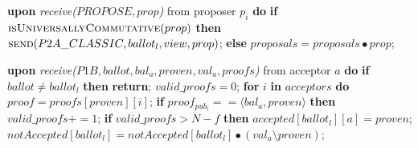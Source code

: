 \begin{algorithm}
\begin{algorithmic}[1]
		\State
		\State \textbf{upon} \textit{receive($PROPOSE, prop$)} from proposer $p_i$ \textbf{do} 
		\State \hspace{\algorithmicindent} \textbf{if} $\Call{isUniversallyCommutative}{prop}$ \textbf{then}
		\State \hspace{\algorithmicindent}\hspace{\algorithmicindent} $\Call{send}{P2A\_CLASSIC, ballot_l,view, prop}$;
		\State \hspace{\algorithmicindent} \textbf{else}
		\State \hspace{\algorithmicindent}\hspace{\algorithmicindent} $proposals = proposals \bullet prop$;
		
		\State
		\State \textbf{upon} \textit{receive($P1B, ballot, bal_a, proven,val_a, proofs$)} from acceptor $a$ \textbf{do}
		\State \hspace{\algorithmicindent} \textbf{if} $ballot \neq ballot_l$ \textbf{then}
		\State \hspace{\algorithmicindent}\hspace{\algorithmicindent} \textbf{return};
		\State
		\State \hspace{\algorithmicindent} $valid\_proofs = 0$; 
		\State \hspace{\algorithmicindent} \textbf{for} $i$ \textbf{in} $acceptors$ \textbf{do}
		\State \hspace{\algorithmicindent}\hspace{\algorithmicindent} $proof = proofs[proven][i]$;
		\State \hspace{\algorithmicindent}\hspace{\algorithmicindent} \textbf{if} $proof_{pub_i} == \langle bal_a, proven \rangle$ \textbf{then}
		\State \hspace{\algorithmicindent}\hspace{\algorithmicindent}\hspace{\algorithmicindent} 
		$valid\_proofs \mathrel{+{=}} 1$;
		\State
		\State \hspace{\algorithmicindent} \textbf{if} $valid\_proofs > N-f$ \textbf{then}
		\State \hspace{\algorithmicindent}\hspace{\algorithmicindent}\hspace{\algorithmicindent} $accepted[ballot_l][a] = proven$;
		\State \hspace{\algorithmicindent}\hspace{\algorithmicindent}\hspace{\algorithmicindent}		$notAccepted[ballot_l] = notAccepted[ballot_l] \bullet (val_a \setminus proven)$;		
		

\end{algorithmic}
\end{algorithm}
